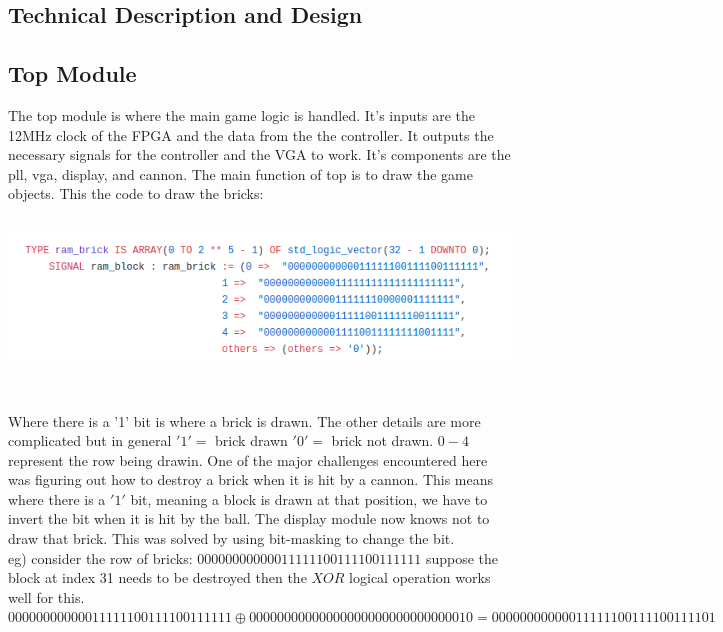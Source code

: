 \documentclass[12pt]{article}
\begin{document}
\begin{flushleft}
\section{Technical Description and Design}
\subsection{Top Module}

The top module is where the main game logic is handled. It's inputs are the
12MHz clock of the FPGA and the data from the the controller. It outputs the
necessary signals for the controller and the VGA to work. It's components
are the pll, vga, display, and cannon. The main function of top is to draw the
game objects. This the code to draw the bricks:\\
\includegraphics[width=15cm, height=5cm]{drawingBricks}

Where there is a '1' bit is where a brick is drawn. The other details are more
complicated but in general $'1' = $ brick drawn $'0'=$ brick not drawn. $0 - 4$
represent the row being drawin. One of the major challenges encountered here was
figuring out how to destroy a brick when it is hit by a cannon. This means where
there is a $'1'$ bit, meaning a block is drawn at that position, we have to invert
the bit when it is hit by the ball. The display module now knows not to draw
that brick. This was solved by using bit-masking to change the bit.\\ 
eg) consider the row of bricks: $00000000000011111100111100111111$
suppose the block at index 31 needs to be destroyed then the $XOR$ logical
operation works well for this. 
$00000000000011111100111100111111 \oplus 00000000000000000000000000000010 =
00000000000011111100111100111101$ 


\end{flushleft}
\end{document}
